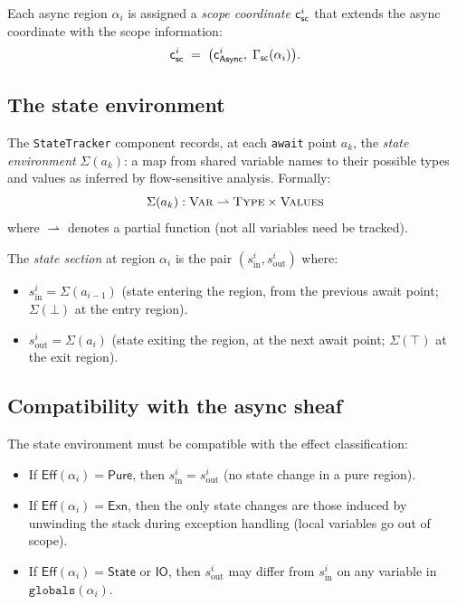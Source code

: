 \documentclass[11pt]{article}
\newcommand{\Async}{\mathsf{Async}}          %
\newcommand{\asyncCoord}[1]{\coord_{\Async}^{#1}} %
\newcommand{\Epure}{\mathsf{Pure}}           %
\newcommand{\Eexn}{\mathsf{Exn}}             %
\newcommand{\Estate}{\mathsf{State}}         %
\newcommand{\Eio}{\mathsf{IO}}               %
\newcommand{\effectClass}[1]{\mathsf{Eff}(#1)} %
\newcommand{\asyncRegion}[1]{\alpha_{#1}}    %
\newcommand{\scopeEnv}{\Gamma_{\mathsf{sc}}} %
\newcommand{\stateEnv}{\Sigma}               %
\begin{document}
\begin{definition}\label{def:scope-coord}
Each async region $\asyncRegion{i}$ is assigned a \emph{scope coordinate}
$\mathsf{c}_{\mathsf{sc}}^i$ that extends the async coordinate with the scope
information:
\[
  \coord_{\mathsf{sc}}^i
  \;=\;
  \bigl(\asyncCoord{i},\; \scopeEnv(\asyncRegion{i})\bigr).
\]
\end{definition}

\subsection{The state environment}

The \texttt{StateTracker} component records, at each \texttt{await} point
$a_k$, the \emph{state environment} $\stateEnv(a_k)$: a map from shared
variable names to their possible types and values as inferred by
flow-sensitive analysis.  Formally:
\[
  \stateEnv(a_k) : \textsc{Var} \rightharpoonup \textsc{Type} \times \textsc{Values}
\]
where $\rightharpoonup$ denotes a partial function (not all variables need be
tracked).

\begin{definition}\label{def:state-sec}
The \emph{state section} at region $\asyncRegion{i}$ is the pair
$(s_{\mathrm{in}}^i, s_{\mathrm{out}}^i)$ where:
\begin{itemize}
  \item $s_{\mathrm{in}}^i = \stateEnv(a_{i-1})$ (state entering the region,
        from the previous await point; $\stateEnv(\bot)$ at the entry region).
  \item $s_{\mathrm{out}}^i = \stateEnv(a_i)$ (state exiting the region,
        at the next await point; $\stateEnv(\top)$ at the exit region).
\end{itemize}
\end{definition}

\subsection{Compatibility with the async sheaf}

The state environment must be compatible with the effect classification:
\begin{itemize}
  \item If $\effectClass{\asyncRegion{i}} = \Epure$, then
        $s_{\mathrm{in}}^i = s_{\mathrm{out}}^i$
        (no state change in a pure region).
  \item If $\effectClass{\asyncRegion{i}} = \Eexn$, then the only state
        changes are those induced by unwinding the stack during exception
        handling (local variables go out of scope).
  \item If $\effectClass{\asyncRegion{i}} = \Estate$ or $\Eio$, then
        $s_{\mathrm{out}}^i$ may differ from $s_{\mathrm{in}}^i$ on any
        variable in $\texttt{globals}(\asyncRegion{i})$.
\end{itemize}
\end{document}
